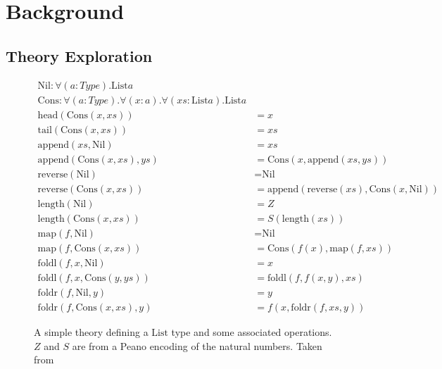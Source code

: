 
\section{Background}
\label{sec:background}

\subsection{Theory Exploration}
\label{sec:te}



\begin{figure}
  \label{figure:list_theory}
  \begin{equation*}
    \begin{split}
      \text{Nil} : \forall (a : Type). \text{List} a \\
      \text{Cons} : \forall (a : Type). \forall (x : a). \forall (xs : \text{List} a). \text{List} a \\
      \text{head}(\text{Cons}(x, xs)) &= x \\
      \text{tail}(\text{Cons}(x, xs)) &= xs \\
      \text{append}(xs, \text{Nil}) &= xs \\
      \text{append}(\text{Cons}(x, xs), ys) &= \text{Cons}(x, \text{append}(xs, ys)) \\
      \text{reverse}(\text{Nil}) &= \text{Nil} \\
      \text{reverse}(\text{Cons}(x, xs)) &= \text{append}(\text{reverse}(xs), \text{Cons}(x, \text{Nil})) \\
      \text{length}(\text{Nil}) &= Z \\
      \text{length}(\text{Cons}(x, xs)) &= S (\text{length}(xs)) \\
      \text{map}(f, \text{Nil}) &= \text{Nil} \\
      \text{map}(f, \text{Cons}(x, xs)) &= \text{Cons}(f(x), \text{map}(f, xs)) \\
      \text{foldl}(f, x, \text{Nil}) &= x \\
      \text{foldl}(f, x, \text{Cons}(y, ys)) &= \text{foldl}(f, f(x, y), xs) \\
      \text{foldr}(f, \text{Nil}, y) &= y \\
      \text{foldr}(f, \text{Cons}(x, xs), y) &= f(x, \text{foldr}(f, xs, y))
    \end{split}
  \end{equation*}
  \caption{A simple theory defining a $\text{List}$ type and some associated
    operations. $Z$ and $S$ are from a Peano encoding of the natural numbers.
    Taken from \cite{Johansson.Dixon.Bundy:conjecture-generation}}
\end{figure}

